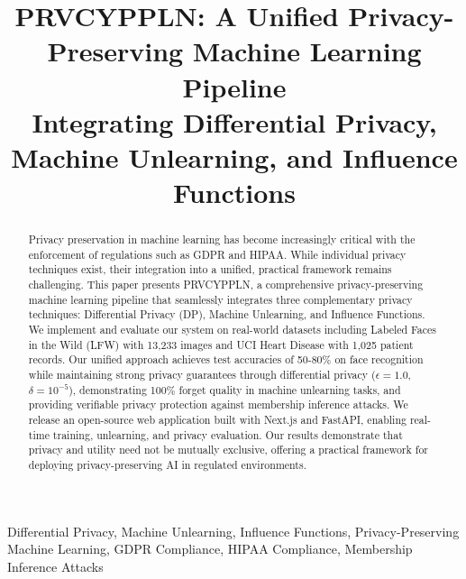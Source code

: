 \documentclass[conference]{IEEEtran}
\begin{document}
\title{PRVCYPPLN: A Unified Privacy-Preserving Machine Learning Pipeline\\
Integrating Differential Privacy, Machine Unlearning, and Influence Functions}

\author{
\and
{}
\and
{}
}

\maketitle

\begin{abstract}
Privacy preservation in machine learning has become increasingly critical with the enforcement of regulations such as GDPR and HIPAA. While individual privacy techniques exist, their integration into a unified, practical framework remains challenging. This paper presents PRVCYPPLN, a comprehensive privacy-preserving machine learning pipeline that seamlessly integrates three complementary privacy techniques: Differential Privacy (DP), Machine Unlearning, and Influence Functions. We implement and evaluate our system on real-world datasets including Labeled Faces in the Wild (LFW) with 13,233 images and UCI Heart Disease with 1,025 patient records. Our unified approach achieves test accuracies of 50-80\% on face recognition while maintaining strong privacy guarantees through differential privacy ($\epsilon=1.0$, $\delta=10^{-5}$), demonstrating 100\% forget quality in machine unlearning tasks, and providing verifiable privacy protection against membership inference attacks. We release an open-source web application built with Next.js and FastAPI, enabling real-time training, unlearning, and privacy evaluation. Our results demonstrate that privacy and utility need not be mutually exclusive, offering a practical framework for deploying privacy-preserving AI in regulated environments.
\end{abstract}

\begin{IEEEkeywords}
Differential Privacy, Machine Unlearning, Influence Functions, Privacy-Preserving Machine Learning, GDPR Compliance, HIPAA Compliance, Membership Inference Attacks
\end{IEEEkeywords}
\end{document}
